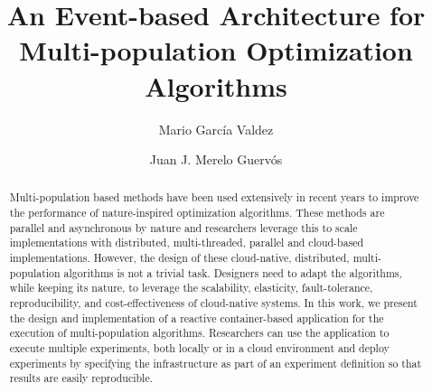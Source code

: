 \documentclass[review]{elsarticle}
\begin{document}
\begin{frontmatter}

\title{An Event-based Architecture for Multi-population Optimization Algorithms}

\author[itt]{Mario Garc\'ia Valdez}

\author[granada]{Juan J. Merelo Guerv\'os}

\address[itt]{Department of Graduate Studies, Instituto Tecnol\'ogico de Tijuana, Tijuana BC, Mexico}
\address[granada]{Universidad de Granada, Granada, Spain}

\begin{abstract} 
Multi-population based methods have been used extensively in
recent years to improve the performance of nature-inspired optimization
algorithms. These methods are parallel and asynchronous by nature and researchers
leverage this to scale implementations %
with distributed, multi-threaded,
parallel and cloud-based implementations. %
However, the design  of these cloud-native,  
distributed, multi-population algorithms is not a trivial task. Designers need to adapt the algorithms,
while keeping its nature, to
leverage the scalability, elasticity, fault-tolerance,
reproducibility, and cost-effectiveness of cloud-native systems. 
In this
work, we present the design and implementation of a reactive container-based
application for the execution of multi-population algorithms. Researchers can
use the application to execute multiple experiments, both locally or in a cloud
environment and deploy experiments by specifying the infrastructure as part of
an experiment definition so that results are easily reproducible. %

\end{abstract}
\end{frontmatter}
\end{document}

